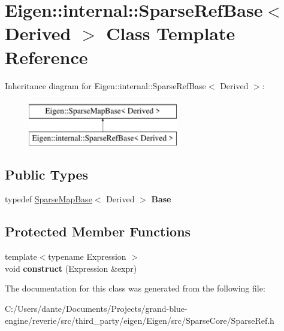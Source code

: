 \hypertarget{class_eigen_1_1internal_1_1_sparse_ref_base}{}\section{Eigen\+::internal\+::Sparse\+Ref\+Base$<$ Derived $>$ Class Template Reference}
\label{class_eigen_1_1internal_1_1_sparse_ref_base}
Inheritance diagram for Eigen\+::internal\+::Sparse\+Ref\+Base$<$ Derived $>$\+:\begin{figure}[H]
\begin{center}
\leavevmode
\includegraphics[height=2.000000cm]{class_eigen_1_1internal_1_1_sparse_ref_base}
\end{center}
\end{figure}
\subsection*{Public Types}
\begin{DoxyCompactItemize}
\item 
\mbox{\label{class_eigen_1_1internal_1_1_sparse_ref_base_a13de1d6877d45d0a108d02e8059924dd}} 
typedef \mbox{\hyperlink{class_eigen_1_1_sparse_map_base}{Sparse\+Map\+Base}}$<$ Derived $>$ {\bfseries Base}
\end{DoxyCompactItemize}
\subsection*{Protected Member Functions}
\begin{DoxyCompactItemize}
\item 
\mbox{\label{class_eigen_1_1internal_1_1_sparse_ref_base_a250b1b345c644eefaa493d17490c42fe}} 
{\footnotesize template$<$typename Expression $>$ }\\void {\bfseries construct} (Expression \&expr)
\end{DoxyCompactItemize}


The documentation for this class was generated from the following file\+:\begin{DoxyCompactItemize}
\item 
C\+:/\+Users/dante/\+Documents/\+Projects/grand-\/blue-\/engine/reverie/src/third\+\_\+party/eigen/\+Eigen/src/\+Sparse\+Core/Sparse\+Ref.\+h\end{DoxyCompactItemize}
